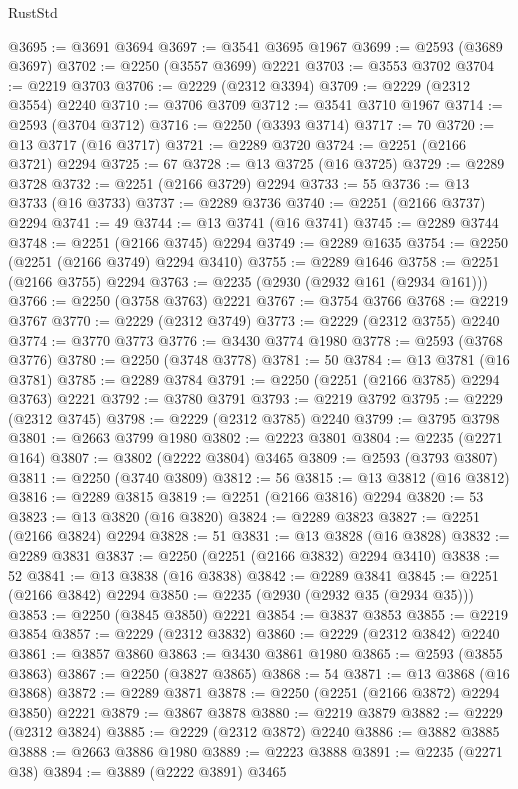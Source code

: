 \begin{lexlean}{RustStd}
\begin{coremodule}
@3695 := @3691 @3694
@3697 := @3541 @3695 @1967
@3699 := @2593 (@3689 @3697)
@3702 := @2250 (@3557 @3699) @2221
@3703 := @3553 @3702
@3704 := @2219 @3703
@3706 := @2229 (@2312 @3394)
@3709 := @2229 (@2312 @3554) @2240
@3710 := @3706 @3709
@3712 := @3541 @3710 @1967
@3714 := @2593 (@3704 @3712)
@3716 := @2250 (@3393 @3714)
@3717 := 70
@3720 := @13 @3717 (@16 @3717)
@3721 := @2289 @3720
@3724 := @2251 (@2166 @3721) @2294
@3725 := 67
@3728 := @13 @3725 (@16 @3725)
@3729 := @2289 @3728
@3732 := @2251 (@2166 @3729) @2294
@3733 := 55
@3736 := @13 @3733 (@16 @3733)
@3737 := @2289 @3736
@3740 := @2251 (@2166 @3737) @2294
@3741 := 49
@3744 := @13 @3741 (@16 @3741)
@3745 := @2289 @3744
@3748 := @2251 (@2166 @3745) @2294
@3749 := @2289 @1635
@3754 := @2250 (@2251 (@2166 @3749) @2294 @3410)
@3755 := @2289 @1646
@3758 := @2251 (@2166 @3755) @2294
@3763 := @2235 (@2930 (@2932 @161 (@2934 @161)))
@3766 := @2250 (@3758 @3763) @2221
@3767 := @3754 @3766
@3768 := @2219 @3767
@3770 := @2229 (@2312 @3749)
@3773 := @2229 (@2312 @3755) @2240
@3774 := @3770 @3773
@3776 := @3430 @3774 @1980
@3778 := @2593 (@3768 @3776)
@3780 := @2250 (@3748 @3778)
@3781 := 50
@3784 := @13 @3781 (@16 @3781)
@3785 := @2289 @3784
@3791 := @2250 (@2251 (@2166 @3785) @2294 @3763) @2221
@3792 := @3780 @3791
@3793 := @2219 @3792
@3795 := @2229 (@2312 @3745)
@3798 := @2229 (@2312 @3785) @2240
@3799 := @3795 @3798
@3801 := @2663 @3799 @1980
@3802 := @2223 @3801
@3804 := @2235 (@2271 @164)
@3807 := @3802 (@2222 @3804) @3465
@3809 := @2593 (@3793 @3807)
@3811 := @2250 (@3740 @3809)
@3812 := 56
@3815 := @13 @3812 (@16 @3812)
@3816 := @2289 @3815
@3819 := @2251 (@2166 @3816) @2294
@3820 := 53
@3823 := @13 @3820 (@16 @3820)
@3824 := @2289 @3823
@3827 := @2251 (@2166 @3824) @2294
@3828 := 51
@3831 := @13 @3828 (@16 @3828)
@3832 := @2289 @3831
@3837 := @2250 (@2251 (@2166 @3832) @2294 @3410)
@3838 := 52
@3841 := @13 @3838 (@16 @3838)
@3842 := @2289 @3841
@3845 := @2251 (@2166 @3842) @2294
@3850 := @2235 (@2930 (@2932 @35 (@2934 @35)))
@3853 := @2250 (@3845 @3850) @2221
@3854 := @3837 @3853
@3855 := @2219 @3854
@3857 := @2229 (@2312 @3832)
@3860 := @2229 (@2312 @3842) @2240
@3861 := @3857 @3860
@3863 := @3430 @3861 @1980
@3865 := @2593 (@3855 @3863)
@3867 := @2250 (@3827 @3865)
@3868 := 54
@3871 := @13 @3868 (@16 @3868)
@3872 := @2289 @3871
@3878 := @2250 (@2251 (@2166 @3872) @2294 @3850) @2221
@3879 := @3867 @3878
@3880 := @2219 @3879
@3882 := @2229 (@2312 @3824)
@3885 := @2229 (@2312 @3872) @2240
@3886 := @3882 @3885
@3888 := @2663 @3886 @1980
@3889 := @2223 @3888
@3891 := @2235 (@2271 @38)
@3894 := @3889 (@2222 @3891) @3465

\end{coremodule}
\end{lexlean}

